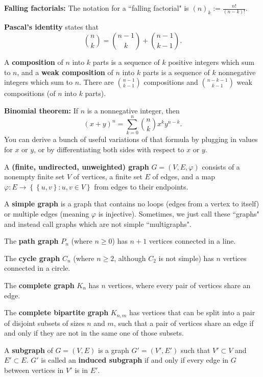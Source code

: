 \documentclass[10pt]{article}
\begin{document}
\par
\textbf{Falling factorials:} The notation for a ``falling factorial" is $(n)_k := \frac{n!}{(n-k)!}$.
\par
\textbf{Pascal's identity} states that
\[ \binom{n}{k} = \binom{n-1}{k} + \binom{n-1}{k-1}. \]
\par
A \textbf{composition} of $n$ into $k$ parts is a sequence of $k$ positive integers which sum to $n$, and a \textbf{weak composition} of $n$ into $k$ parts is a sequence of $k$ nonnegative integers which sum to $n$. There are $\binom{n-1}{k-1}$ compositions and $\binom{n-k-1}{k-1}$ weak compositions (of $n$ into $k$ parts).
\par
\textbf{Binomial theorem:} If $n$ is a nonnegative integer, then
\[ (x+y)^n = \sum_{k=0}^n \binom{n}{k} x^ky^{n-k}. \]
You can derive a bunch of useful variations of that formula by plugging in values for $x$ or $y$, or by differentiating both sides with respect to $x$ or $y$.
\par
A \textbf{(finite, undirected, unweighted) graph} $G=(V,E,\varphi)$ consists of a nonempty finite set $V$ of vertices, a finite set $E$ of edges, and a map $\varphi: E \rightarrow \left\{ \left\{ u,v \right\}: u,v \in V \right\}$ from edges to their endpoints.
\par
A \textbf{simple graph} is a graph that contains no loops (edges from a vertex to itself) or multiple edges (meaning $\varphi$ is injective). Sometimes, we just call these ``graphs" and instead call graphs which are not simple ``multigraphs".
\par
The \textbf{path graph} $P_n$ (where $n \geq 0$) has $n+1$ vertices connected in a line.
\par
The \textbf{cycle graph} $C_n$ (where $n \geq 2$, although $C_2$ is not simple) has $n$ vertices connected in a circle.
\par
The \textbf{complete graph} $K_n$ has $n$ vertices, where every pair of vertices share an edge.
\par
The \textbf{complete bipartite graph} $K_{n,m}$ has vertices that can be split into a pair of disjoint subsets of sizes $n$ and $m$, such that a pair of vertices share an edge if and only if they are not in the same one of those subsets.
\par
A \textbf{subgraph} of $G=(V,E)$ is a graph $G' = (V', E')$ such that $V' \subset V$ and $E' \subset E$. $G'$ is called an \textbf{induced subgraph} if and only if every edge in $G$ between vertices in $V'$ is in $E'$.
\par
\end{document}
